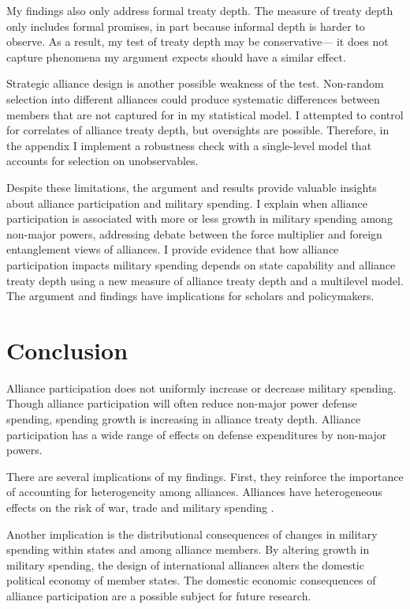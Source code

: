 \documentclass[12pt]{article}
\begin{document}
My findings also only address formal treaty depth. 
The measure of treaty depth only includes formal promises, in part because informal depth is harder to observe. 
As a result, my test of treaty depth may be conservative--- it does not capture phenomena my argument expects should have a similar effect. 


Strategic alliance design is another possible weakness of the test. 
Non-random selection into different alliances could produce systematic differences between members that are not captured for in my statistical model. 
I attempted to control for correlates of alliance treaty depth, but oversights are possible.
Therefore, in the appendix I implement a robustness check with a single-level model that accounts for selection on unobservables.  


Despite these limitations, the argument and results provide valuable insights about alliance participation and military spending. 
I explain when alliance participation is associated with more or less growth in military spending among non-major powers, addressing debate between the force multiplier and foreign entanglement views of alliances.  
I provide evidence that how alliance participation impacts military spending depends on state capability and alliance treaty depth using a new measure of alliance treaty depth and a multilevel model. 
The argument and findings have implications for scholars and policymakers. 


\section{Conclusion}

Alliance participation does not uniformly increase or decrease military spending. 
Though alliance participation will often reduce non-major power defense spending, spending growth is increasing in alliance treaty depth. 
Alliance participation has a wide range of effects on defense expenditures by non-major powers. 


There are several implications of my findings.  
First, they reinforce the importance of accounting for heterogeneity among alliances.
Alliances have heterogeneous effects on the risk of war, trade and military spending \citep{Leeds2003, LongLeeds2006, Benson2012, DigiuseppePoast2016}. 


Another implication is the distributional consequences of changes in military spending within states and among alliance members.  
By altering growth in military spending, the design of international alliances alters the domestic political economy of member states. 
The domestic economic consequences of alliance participation are a possible subject for future research. 
\end{document}
